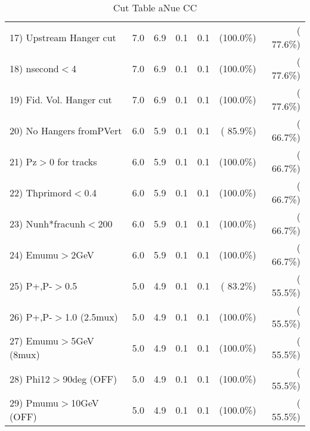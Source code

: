 \begin{table}[h!]
\begin{tabular}{||l||r|r|r|r|r|r||}
 17) Upstream Hanger cut  &          7.0 &          6.9 &          0.1 &          0.1 & (100.0\%) & ( 77.6\%) \\
 18) nsecond$<$4          &          7.0 &          6.9 &          0.1 &          0.1 & (100.0\%) & ( 77.6\%) \\
 19) Fid. Vol. Hanger cut &          7.0 &          6.9 &          0.1 &          0.1 & (100.0\%) & ( 77.6\%) \\
 20) No Hangers fromPVert &          6.0 &          5.9 &          0.1 &          0.1 & ( 85.9\%) & ( 66.7\%) \\
 21) Pz$>$0 for tracks    &          6.0 &          5.9 &          0.1 &          0.1 & (100.0\%) & ( 66.7\%) \\
 22) Thprimord$<$0.4      &          6.0 &          5.9 &          0.1 &          0.1 & (100.0\%) & ( 66.7\%) \\
 23) Nunh*fracunh$<$200   &          6.0 &          5.9 &          0.1 &          0.1 & (100.0\%) & ( 66.7\%) \\
 24) Emumu$>$2GeV         &          6.0 &          5.9 &          0.1 &          0.1 & (100.0\%) & ( 66.7\%) \\
 25) P+,P-$>$0.5          &          5.0 &          4.9 &          0.1 &          0.1 & ( 83.2\%) & ( 55.5\%) \\
 26) P+,P-$>$1.0 (2.5mux) &          5.0 &          4.9 &          0.1 &          0.1 & (100.0\%) & ( 55.5\%) \\
 27) Emumu$>$5GeV  (8mux) &          5.0 &          4.9 &          0.1 &          0.1 & (100.0\%) & ( 55.5\%) \\
 28) Phi12$>$90deg  (OFF) &          5.0 &          4.9 &          0.1 &          0.1 & (100.0\%) & ( 55.5\%) \\
 29) Pmumu$>$10GeV  (OFF) &          5.0 &          4.9 &          0.1 &          0.1 & (100.0\%) & ( 55.5\%) \\
 \hline
 \hline
 \end{tabular}
 \caption{Cut Table  aNue CC  }
 \label{tab-cutcohjpsi-mumu_anuecc}
 \end{table}
